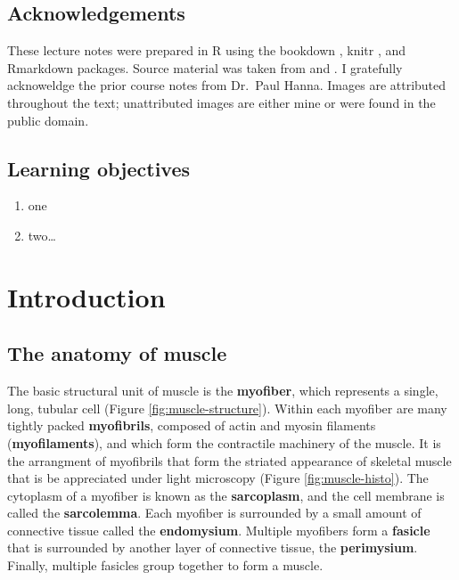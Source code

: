 \documentclass[openany]{book}
\providecommand{\tightlist}{%
  \setlength{\itemsep}{0pt}\setlength{\parskip}{0pt}}
\begin{document}
\section*{Acknowledgements}\label{acknowledgements}

These lecture notes were prepared in R \citep{R-base} using the bookdown
\citep{xie2015}, knitr \citep{R-knitr}, and Rmarkdown
\citep{R-rmarkdown} packages. Source material was taken from
\citet{zachary2016pathologic} and \citet{maxie2015jubb}. I gratefully
acknoweldge the prior course notes from Dr.~Paul Hanna. Images are
attributed throughout the text; unattributed images are either mine or
were found in the public domain.

\section*{Learning objectives}\label{learning-objectives}

\begin{enumerate}
\def\labelenumi{\arabic{enumi}.}
\tightlist
\item
  one
\item
  two\ldots{}
\end{enumerate}

\chapter{Introduction}\label{intro}

\hypertarget{the-anatomy-of-muscle}{\section{The anatomy of
muscle}\label{the-anatomy-of-muscle}}

The basic structural unit of muscle is the \textbf{myofiber}, which
represents a single, long, tubular cell (Figure
\ref{fig:muscle-structure}). Within each myofiber are many tightly
packed \textbf{myofibrils}, composed of actin and myosin filaments
(\textbf{myofilaments}), and which form the contractile machinery of the
muscle. It is the arrangment of myofibrils that form the striated
appearance of skeletal muscle that is be appreciated under light
microscopy (Figure \ref{fig:muscle-histo}). The cytoplasm of a myofiber
is known as the \textbf{sarcoplasm}, and the cell membrane is called the
\textbf{sarcolemma}. Each myofiber is surrounded by a small amount of
connective tissue called the \textbf{endomysium}. Multiple myofibers
form a \textbf{fasicle} that is surrounded by another layer of
connective tissue, the \textbf{perimysium}. Finally, multiple fasicles
group together to form a muscle.
\end{document}
